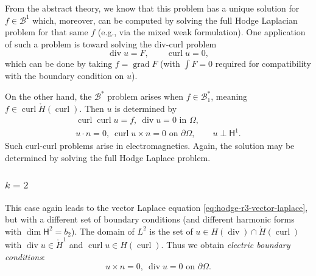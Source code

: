 {From the abstract theory, we know that this problem has a unique solution for $f\in\mathcal B^1$ which, moreover, can be computed by solving the full Hodge Laplacian problem for that same $f$ (e.g., via the mixed weak formulation). One application of such a problem is toward solving the div-curl problem}
\[
\operatorname{div}u=F,\qquad\operatorname{curl}u=0,
\]
{which can be done by taking $f=\operatorname{grad}F$ (with $\int F=0$ required for compatibility with the boundary condition on $u$).}

{On the other hand, the $\mathcal B^*$ problem arises when $f\in\mathcal B_1^*$, meaning $f\in\operatorname{curl}\mathring H(\operatorname{curl})$. Then $u$ is determined by}
\[
\begin{gathered}
\operatorname{curl}\operatorname{curl}u=f,\ \operatorname{div}u=0\text{ in }\Omega,\\
u\cdot n=0,\ \operatorname{curl}u\times n=0\text{ on }\partial\Omega,\qquad u\perp\mathsf H^1.
\end{gathered}
\]
{Such curl-curl problems arise in electromagnetics. Again, the solution may be determined by solving the full Hodge Laplace problem.}

\subsubsection{$k=2$}\label{subsec:hodge-r3-k2}

{This case again leads to the vector Laplace equation \eqref{eq:hodge-r3-vector-laplace}, but with a different set of boundary conditions (and different harmonic forms with $\dim\mathsf H^2=b_2$). The domain of $L^2$ is the set of $u\in H(\operatorname{div})\cap\mathring H(\operatorname{curl})$ with $\operatorname{div}u\in\mathring H^1$ and $\operatorname{curl}u\in H(\operatorname{curl})$. Thus we obtain \emph{electric boundary conditions}:}
\[
u\times n=0,\ \operatorname{div}u=0\text{ on }\partial\Omega.
\]

